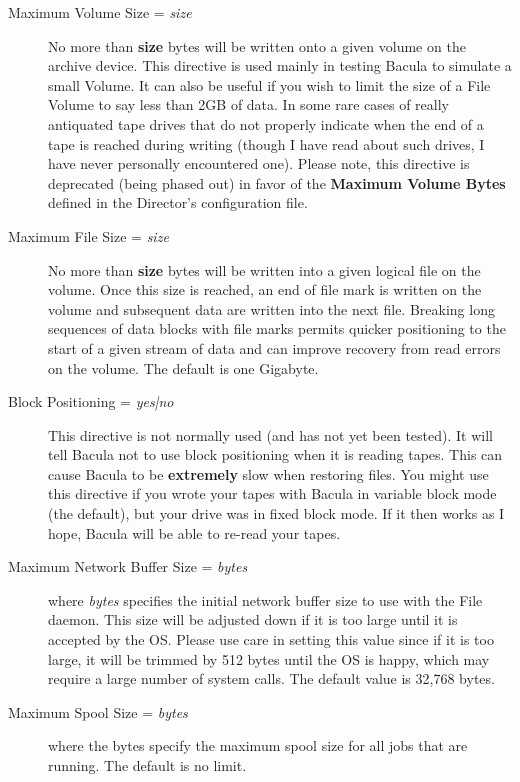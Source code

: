 \begin{description}
\item [Maximum Volume Size = {\it size}]
   No more than {\bf size} bytes will be written onto a given  volume on the
archive device. This directive is used mainly in  testing Bacula to simulate a
small Volume. It can also  be useful if you wish to limit the size of a File
Volume to say  less than 2GB of data. In some rare cases of really antiquated 
tape drives that do not properly indicate when the end of a  tape is reached
during writing (though I have read about such  drives, I have never personally
encountered one). Please note,  this directive is deprecated (being phased
out) in favor of the  {\bf Maximum Volume Bytes} defined in the Director's
configuration  file.  

\item [Maximum File Size = {\it size}]
   No more than {\bf size} bytes will be written into a given  logical file on
the volume. Once this size is reached, an end of  file mark is written on the
volume and subsequent data are written  into the next file. Breaking long
sequences of data blocks with  file marks permits quicker positioning to the
start of a given  stream of data and can improve recovery from read errors on
the  volume. The default is one Gigabyte.

\item [Block Positioning = {\it yes|no}]
   This directive is not normally used (and has not yet been  tested). It will
tell Bacula not to use block positioning when  it is reading tapes. This can
cause Bacula to be {\bf extremely}  slow when restoring files. You might use
this directive if you  wrote your tapes with Bacula in variable block mode
(the default),  but your drive was in fixed block mode. If it then works as  I
hope, Bacula will be able to re-read your tapes. 

\item [Maximum Network Buffer Size = {\it bytes}]
   where {\it bytes} specifies the initial network buffer  size to use with the
File daemon. This size will be adjusted down  if it is too large until it is
accepted by the OS. Please use  care in setting this value since if it is too
large, it will  be trimmed by 512 bytes until the OS is happy, which may
require  a large number of system calls. The default value is 32,768 bytes. 

\item [Maximum Spool Size = {\it bytes}]
   where the bytes specify the maximum spool size for all jobs  that are running.
The default is no limit. 


\end{description}
